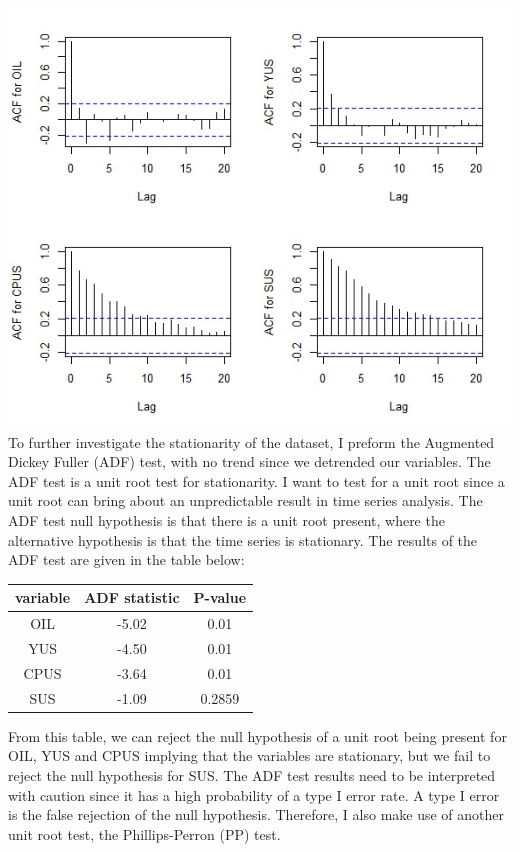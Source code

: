 \documentclass[11pt,preprint, authoryear]{elsarticle}
\numberwithin{equation}{section}
\numberwithin{figure}{section}
\numberwithin{table}{section}
\begin{document}
\includegraphics{ACF.jpg} To further investigate the stationarity of the
dataset, I preform the Augmented Dickey Fuller (ADF) test, with no trend
since we detrended our variables. The ADF test is a unit root test for
stationarity. I want to test for a unit root since a unit root can bring
about an unpredictable result in time series analysis. The ADF test null
hypothesis is that there is a unit root present, where the alternative
hypothesis is that the time series is stationary. The results of the ADF
test are given in the table below:

\begin{center}
\begin{tabular}{ |c|c|c| } 
 \hline
 variable & ADF statistic & P-value \\ 
 \hline
 OIL & -5.02 & 0.01\\ 
 YUS & -4.50 & 0.01 \\
 CPUS & -3.64 & 0.01 \\
 SUS & -1.09 & 0.2859 \\
 \hline
\end{tabular}
\end{center}

From this table, we can reject the null hypothesis of a unit root being
present for OIL, YUS and CPUS implying that the variables are
stationary, but we fail to reject the null hypothesis for SUS. The ADF
test results need to be interpreted with caution since it has a high
probability of a type I error rate. A type I error is the false
rejection of the null hypothesis. Therefore, I also make use of another
unit root test, the Phillips-Perron (PP) test.
\end{document}
